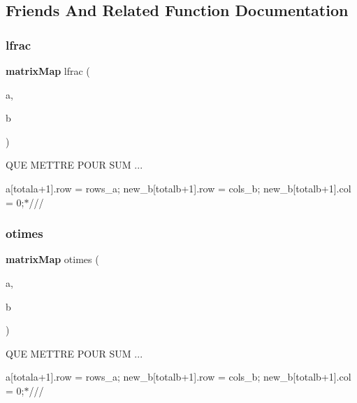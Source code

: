 \subsection{Friends And Related Function Documentation}
\mbox{\label{classmmgd_1_1matrix_map_a2c9da032cf6e833cdf8485882b9afcb8}} 
\subsubsection{lfrac}
{\footnotesize\ttfamily \textbf{ matrix\+Map} lfrac (\begin{DoxyParamCaption}\item[{\textbf{ matrix\+Map} \&}]{a,  }\item[{\textbf{ matrix\+Map} \&}]{b }\end{DoxyParamCaption})\hspace{0.3cm}{\ttfamily [friend]}}

Q\+UE M\+E\+T\+T\+RE P\+O\+UR S\+UM ...


\begin{DoxyItemize}
\item a[totala+1].row = rows\+\_\+a; new\+\_\+b[totalb+1].row = cols\+\_\+b; new\+\_\+b[totalb+1].col = 0;$\ast$/// 
\end{DoxyItemize}\mbox{\label{classmmgd_1_1matrix_map_a4b6c12c96f1fbc423568cf5d96cd2323}} 
\subsubsection{otimes}
{\footnotesize\ttfamily \textbf{ matrix\+Map} otimes (\begin{DoxyParamCaption}\item[{\textbf{ matrix\+Map} \&}]{a,  }\item[{\textbf{ matrix\+Map} \&}]{b }\end{DoxyParamCaption})\hspace{0.3cm}{\ttfamily [friend]}}

Q\+UE M\+E\+T\+T\+RE P\+O\+UR S\+UM ...


\begin{DoxyItemize}
\item a[totala+1].row = rows\+\_\+a; new\+\_\+b[totalb+1].row = cols\+\_\+b; new\+\_\+b[totalb+1].col = 0;$\ast$/// 
\end{DoxyItemize}\mbox{\label{classmmgd_1_1matrix_map_a1ae86cea0b20dbefee5b535bf551a65d}} 
